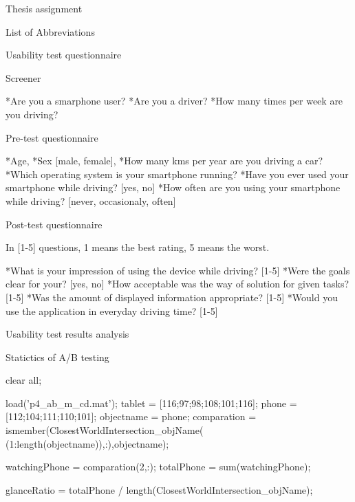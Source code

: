 \def\slet#1#2{\expandafter\let\csname#1\expandafter\endcsname\csname#2\endcsname}
\addto\begitems{\slet{normalitem}{item:o}}


\app Thesis assignment


\nextoddpage

\app List of Abbreviations \par \makeglos

\nextoddpage

\app Usability test questionnaire

\sec Screener

	\begitems
		*Are you a smarphone user?
		*Are you a driver?
		*How many times per week are you driving?
	\enditems

\sec Pre-test questionnaire

	\begitems
		*Age,
		*Sex [male, female],
		*How many kms per year are you driving a car?
		*Which operating system is your smartphone running?
		*Have you ever used your smartphone while driving? [yes, no]
		*How often are you using your smartphone while driving? [never, occasionaly, often]
	\enditems

\sec Post-test questionnaire

In [1-5] questions, 1 means the best rating, 5 means the worst.

	\begitems
		*What is your impression of using the device while driving? [1-5]
		*Were the goals clear for your? [yes, no]
		*How acceptable was the way of solution for given tasks? [1-5]
		*Was the amount of displayed information appropriate? [1-5]
		*Would you use the application in everyday driving time? [1-5]
	\enditems

\nextoddpage

\app Usability test results analysis


\secc Statictics of A/B testing

\begtt

clear all;

load('p4_ab_m_cd.mat');
tablet = [116;97;98;108;101;116];
phone = [112;104;111;110;101];
objectname = phone;
comparation = ismember(ClosestWorldIntersection_objName(
						(1:length(objectname)),:),objectname);

watchingPhone = comparation(2,:);
totalPhone = sum(watchingPhone);

glanceRatio = totalPhone / length(ClosestWorldIntersection_objName);

